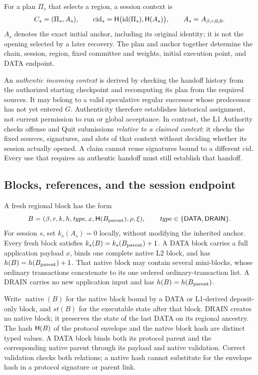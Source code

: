 \begin{definition}
\label{def:session-context}
For a plan $\Pi_s$ that selects a region, a session context is
\[
 C_s=(\Pi_s,A_s),\qquad
 \mathrm{cid}_s=\mathsf H\bigl(\mathrm{id}(\Pi_s),\mathsf H(A_s)\bigr),
 \qquad A_s=A_{\beta,r,0,0}.
\]
$A_s$ denotes the exact initial anchor, including its original identity;
it is not the opening selected by a later recovery. The plan and anchor
together determine the chain, session, region, fixed committee and
weights, initial execution point, and DATA endpoint.
\end{definition}
An \emph{authentic incoming context} is derived by checking the handoff
history from the authorized starting checkpoint and recomputing its
plan from the required sources. It may belong to a valid speculative
regular successor whose predecessor has not yet entered $G$.
Authenticity therefore establishes historical assignment, not current
permission to run or global acceptance. In contrast, the L1 Authority
checks offense and Quit submissions \emph{relative to a claimed context}:
it checks the fixed sources, signatures, and slots of that context
without deciding whether its session actually opened. A claim cannot
reuse signatures bound to a different $\mathrm{cid}$. Every use that
requires an authentic handoff must still establish that handoff.

\subsection{Blocks, references, and the session endpoint}
\label{sec:objects-blocks}

\begin{definition}
\label{def:regional-block}
A fresh regional block has the form
\[
 B=(\beta,r,k,h,\mathit{type},x,\mathsf H(B_{\rm parent}),\rho,\xi),
 \qquad\mathit{type}\in\{\mathsf{DATA},\mathsf{DRAIN}\}.
\]
For session $s$, set $k_s(A_s)=0$ locally, without modifying the inherited
anchor. Every fresh block satisfies $k_s(B)=k_s(B_{\rm parent})+1$.
A DATA block carries a full application payload $x$, binds one complete
native L2 block, and has $h(B)=h(B_{\rm parent})+1$.
That native block may contain several mini-blocks, whose ordinary
transactions concatenate to its one ordered ordinary-transaction list.
A DRAIN carries no new application input and has
$h(B)=h(B_{\rm parent})$.
\end{definition}
Write $\operatorname{native}(B)$ for the native block bound by a DATA or
L1-derived deposit-only block, and $\mathit{st}(B)$ for the executable
state after that block. DRAIN creates no native block; it preserves the
state of the last DATA on its regional ancestry. The hash $\mathsf H(B)$ of
the protocol envelope and the native block hash are distinct typed
values. A DATA block binds both its protocol parent and the corresponding
native parent through its payload and native validation. Correct
validation checks both relations; a native hash cannot substitute for
the envelope hash in a protocol signature or parent link.

